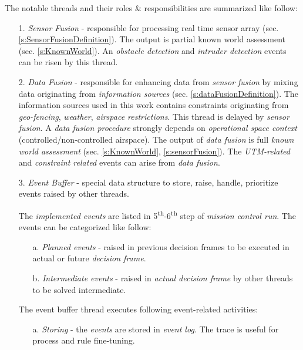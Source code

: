 \noindent The notable threads and their roles \& responsibilities are summarized like follow:
\begin{itemize}
    \item[1.] \emph{Sensor Fusion} - responsible for processing real time sensor array (sec. \ref{s:SensorFusionDefinition}). The output is partial known world assessment (sec. \ref{s:KnownWorld}). An \emph{obstacle detection} and \emph{intruder detection} events can be risen by this thread. 
    
    \item[2.] \emph{Data Fusion} - responsible for enhancing data from \emph{sensor fusion} by mixing data originating from \emph{information sources} (sec. \ref{s:dataFusionDefinition}). The information sources used in this work contains constraints originating from \emph{geo-fencing}, \emph{weather}, \emph{airspace restrictions}. This thread is delayed by \emph{sensor fusion}. A \emph{data fusion procedure} strongly depends on \emph{operational space context} (controlled/non-controlled airspace). The output of \emph{data fusion} is full \emph{known world assessment} (sec. \ref{s:KnownWorld}, \ref{s:sensorFusion}). The \emph{UTM-related} and \emph{constraint related} events can arise from \emph{data fusion}.
    
    \item[3.] \emph{Event Buffer} -  special data structure to store, raise, handle, prioritize events raised by other threads. 
    
    The \emph{implemented events} are listed in 5\textsuperscript{th}-6\textsuperscript{th} step of \emph{mission control run}. The events can be categorized like follow:
    \begin{itemize}
        \item[a.] \emph{Planned events} - raised in previous decision frames to be executed in actual or future \emph{decision frame}. 
        
        \item[b.] \emph{Intermediate events} - raised in \emph{actual decision frame} by other threads to be solved intermediate. 
    \end{itemize}
    
    The event buffer thread executes following event-related activities:
    \begin{itemize}
        \item[a.] \emph{Storing} - the \emph{events} are stored in \emph{event log}. The trace is useful for process and rule fine-tuning. 
        

\end{itemize}
\end{itemize}
